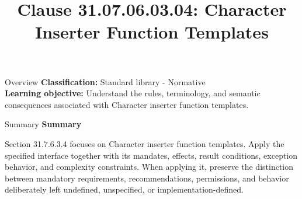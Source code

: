 \documentclass[10pt,letterpaper]{article}
\title{Clause 31.07.06.03.04: Character Inserter Function Templates}
\author{}
\date{}
\begin{document}
\maketitle
\begin{CornellOverviewBox}{Overview}
\textbf{Classification:} Standard library - Normative\\[2pt]
\textbf{Learning objective:} Understand the rules, terminology, and semantic consequences associated with Character inserter function templates.
\end{CornellOverviewBox}\begin{CornellSummaryBox}{Summary}
{\sffamily\bfseries\color{Accent} Summary}\par\vspace{3pt}Section 31.7.6.3.4 focuses on Character inserter function templates. Apply the specified interface together with its mandates, effects, result conditions, exception behavior, and complexity constraints. When applying it, preserve the distinction between mandatory requirements, recommendations, permissions, and behavior deliberately left undefined, unspecified, or implementation-defined.
\end{CornellSummaryBox}
\end{document}
